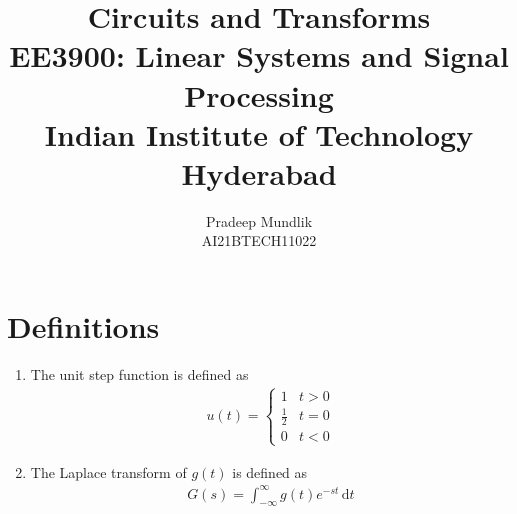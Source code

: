 \documentclass[journal,12pt,twocolumn]{IEEEtran}
\title{Circuits and Transforms \\ \Large EE3900: Linear Systems and Signal Processing \\ \large Indian Institute of Technology Hyderabad}
\author{Pradeep Mundlik \\ \normalsize AI21BTECH11022 \\ \vspace*{20pt} }
\providecommand{\der}[1]{\mathrm{d} #1}
\numberwithin{equation}{section}
\numberwithin{figure}{section}
\renewcommand\thesection{\arabic{section}}
\begin{document}
	\maketitle

	\section{Definitions}
	\begin{enumerate}[label=\thesection.\arabic*,ref=\thesection.\theenumi]
	\item The unit step function is defined as
	\begin{align}
		u(t) =
		\begin{cases}
			1 & t > 0 \\
			\frac{1}{2} & t = 0 \\
			0 & t < 0
		\end{cases}
	\end{align}
		
	\item The Laplace transform of $g(t)$ is defined as 
	\begin{align}
		G(s) = \int_{-\infty}^{\infty} g(t) e^{-st}\, \der{t}
	\end{align}
	\end{enumerate}
	
\end{document}
